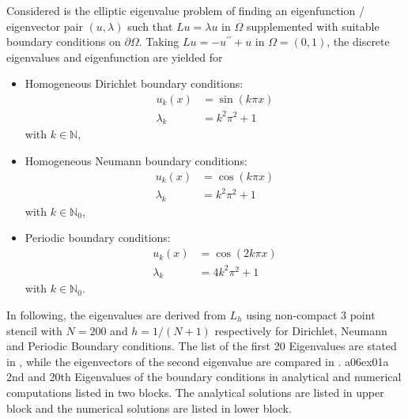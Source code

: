 \newcommand{\assignmentDate}{December 7th, 2019}
%

%
Considered is the elliptic eigenvalue problem of finding an eigenfunction / eigenvector pair $(u, \lambda)$ such that $L u = \lambda u$ in $\Omega$ supplemented with suitable boundary conditions on $\partial \Omega$.
%
Taking $L u = -u^{\prime \prime} + u$ in $\Omega = (0,1)$, the discrete eigenvalues and eigenfunction are yielded for
\begin{itemize}
	\item Homogeneous Dirichlet boundary conditions:
		\begin{align}
			u_k(x) 	   &= \sin{(k \pi x)}\\
			\lambda _k &= k^2 \pi ^2 + 1
		\end{align}
		with $k \in \mathbb{N}$,
		
	\item Homogeneous Neumann boundary conditions:
		\begin{align}
			u_k(x) 	   &= \cos{(k \pi x)}\\
			\lambda _k &= k^2 \pi ^2 + 1
		\end{align}
		with $k \in \mathbb{N}_0$,
		
	\item Periodic boundary conditions:
		\begin{align}
			u_k(x) 	   &= \cos{(2 k \pi x)} \\
			\lambda _k &= 4 k^2 \pi^2 + 1
		\end{align}
		with $k \in \mathbb{N}_0$.
		
\end{itemize}
%
In following, the eigenvalues are derived from $L_h$ using non-compact 3 point stencil with $N = 200$ and $h = 1/(N+1)$ respectively for Dirichlet, Neumann and Periodic Boundary conditions.
%
The list of the first 20 Eigenvalues  are stated in , while the eigenvectors of the second eigenvalue are compared in .
%
\vspace*{\FigUpperVSpace}
		 {a06ex01a}
		 {2nd and 20th Eigenvalues of the boundary conditions in analytical and numerical computations listed in two blocks.
		  The analytical solutions are listed in upper block and the numerical solutions are listed in lower block.}

